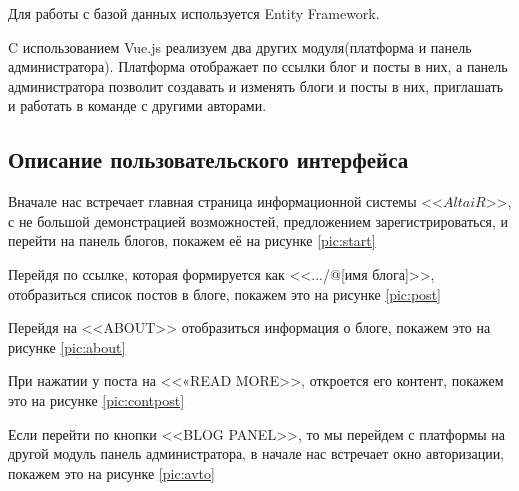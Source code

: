 Для работы с базой данных используется Entity Framework.

C использованием Vue.js реализуем два других модуля(платформа и панель администратора). Платформа отображает по ссылки блог и посты в них, а панель администратора позволит создавать и изменять блоги и посты в них, приглашать и работать в команде с другими авторами. 

\pagebreak
\subsection{Описание пользовательского интерфейса}

Вначале нас встречает главная страница информационной системы <<$AltaiR$>>, с не большой демонстрацией возможностей, предложением зарегистрироваться, и перейти на панель блогов, покажем её на рисунке \ref{pic:start}


Перейдя по ссылке, которая формируется как <<.../@[имя блога]>>, отобразиться список постов в блоге, покажем это на рисунке \ref{pic:post}


\pagebreak
Перейдя на <<ABOUT>> отобразиться информация о блоге, покажем это на рисунке \ref{pic:about}


При нажатии у поста на <<«READ MORE>>, откроется его контент, покажем это на рисунке \ref{pic:contpost}


\pagebreak
Если перейти по кнопки <<BLOG PANEL>>, то мы перейдем с платформы на другой модуль панель администратора, в начале нас встречает окно авторизации, покажем это на рисунке \ref{pic:avto}


\pagebreak